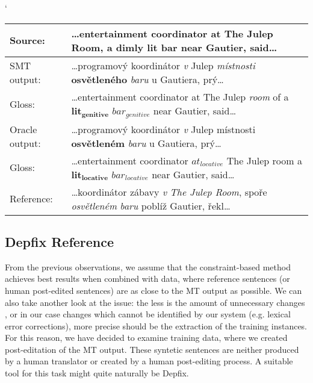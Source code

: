 \begin{myexample}
    \small
    \catcode`
    \begin{center}
    \begin{tabular}{|l|p{}|}
    \hline
    \textbf{Source:}  &  \textbf{…entertainment coordinator at The Julep Room, a dimly lit bar near Gautier, said…}  \\
    \hline
    SMT output:  &  …programový koordinátor \textit{v} Julep \textit{místnosti} \textbf{osvětleného} \textit{baru} u Gautiera, prý…  \\
    \hline
    Gloss:  &  …entertainment coordinator at The Julep \textit{room} of a $\mathbf{lit_{genitive}}$ $\mathit{bar_{genitive}}$ near Gautier, said…  \\
    \hline
    Oracle output:  &  …programový koordinátor \textit{v} Julep místnosti \textbf{osvětleném} \textit{baru} u Gautiera, prý…  \\
    \hline
    Gloss:  &  …entertainment coordinator $\mathit{at_{locative}}$ The Julep room a $\mathbf{lit_{locative}}$ $\mathit{bar_{locative}}$ near Gautier, said…  \\
    \hline
    Reference:  &  …koordinátor zábavy \textit{v} \textit{The Julep Room}, spoře \textit{osvětleném} \textit{baru} poblíž Gautier, řekl…  \\
    \hline
    \end{tabular}
    \label{ex-oracle-ambig}
    \end{center}
\end{myexample}

\subsection{Depfix Reference}

From the previous observations, we assume that the constraint-based method achieves
best results when combined with data, where reference sentences
(or human post-edited sentences) are as close to the MT output as possible.
We can also take another look at the issue: the less is the amount of unnecessary changes
, or in our case changes which cannot be identified by our system (e.g. lexical error corrections),
more precise should be the extraction of the training instances.
For this reason, we have decided to examine training data, where we created  post-editation
of the MT output. These syntetic sentences are neither produced by a human translator
or created by a human post-editing process. A suitable tool for this task might quite naturally be Depfix.

